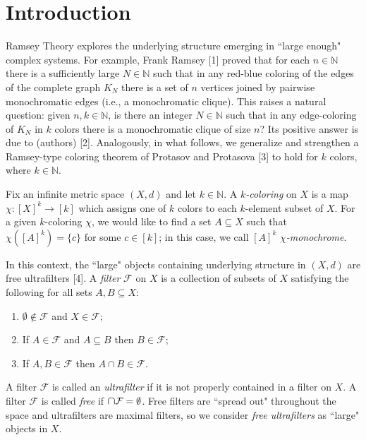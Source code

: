 \section{Introduction}
Ramsey Theory explores the underlying structure emerging in ``large enough" complex systems. For example, Frank Ramsey [1] proved that for each \( n \in \mathbb{N}  \) there is a sufficiently large \( N \in \mathbb{N}  \) such that in any red-blue coloring of the edges of the complete graph \( K_{N} \) there is a set of \( n \) vertices joined by pairwise monochromatic edges (i.e., a monochromatic clique).  This raises a natural question: given \( n, k \in \mathbb{N}  \), is there an integer \( N \in \mathbb{N} \) such that in any edge-coloring of \( K_{N}  \) in \( k \) colors there is a monochromatic clique of size \( n \)? Its positive answer is due to (authors) [2]. Analogously, in what follows, we generalize and strengthen a Ramsey-type coloring theorem of Protasov and Protasova [3] to hold for $k$ colors, where \( k \in \mathbb{N}  \).

Fix an infinite metric space \( (X,d) \) and let \( k \in \mathbb{N}  \). A \emph{\( k \)-coloring} on \( X \) is a map \( \chi : [X]^{k} \to [k]  \) which assigns one of \( k \) colors to each \( k \)-element subset of \( X \). For a given \( k \)-coloring \( \chi \), we would like to find a set \( A \subseteq X \) such that \( \chi ([A]^{k}) = \{ c \}  \) for some \( c \in [k] \); in this case, we call \( [A]^{k}  \) \emph{\( \chi \)-monochrome}.

In this context, the ``large" objects containing underlying structure in \( (X,d) \) are free ultrafilters [4]. A \emph{filter} \( \mathcal{F}  \) on \( X \) is a collection of subsets of \( X \) satisfying the following for all sets \( A, B \subseteq X \):
\begin{enumerate}[leftmargin=1.2cm]
	\item \( \emptyset  \notin \mathcal{F}  \) and \( X \in \mathcal{F}  \);
	\item If \( A \in \mathcal{F} \) and \( A \subseteq B \) then \( B \in \mathcal{F}  \);
	\item If \( A, B \in \mathcal{F}  \) then \( A \cap B \in \mathcal{F}  \).
\end{enumerate}
A filter \( \mathcal{F}  \) is called an \emph{ultrafilter} if it is not properly contained in a filter on \( X \). A filter \( \mathcal{F}  \) is called \emph{free} if \( \medcap \mathcal{F} = \emptyset  \). Free filters are ``spread out" throughout the space and ultrafilters are maximal filters, so we consider \emph{free ultrafilters} as ``large" objects in \( X \).

